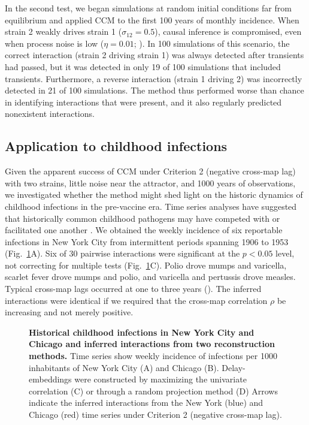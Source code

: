 \documentclass[10pt,letterpaper]{article}
\begin{document}
In the second test, we began simulations at random initial conditions far from equilibrium and applied CCM to the first 100 years of monthly incidence.
When strain 2 weakly drives strain 1 ($\sigma_{12}=0.5$), causal inference is compromised, even when process noise is low ($\eta=0.01$; ).
In 100 simulations of this scenario, the correct interaction (strain 2 driving strain 1) was always detected after transients had passed, but it was detected in only 19 of 100 simulations that included transients.
Furthermore, a reverse interaction (strain 1 driving 2) was incorrectly detected in 21 of 100 simulations.
The method thus performed worse than chance in identifying interactions that were present, and it also regularly predicted nonexistent interactions.

\subsection*{Application to childhood infections}

Given the apparent success of CCM under Criterion 2 (negative cross-map lag) with two strains, little noise near the attractor, and 1000 years of observations, we investigated whether the method might shed light on the historic dynamics of childhood infections in the pre-vaccine era.
Time series analyses have suggested that historically common childhood pathogens may have competed with or facilitated one another \cite{Mina2015, Rohani2003}.
We obtained the weekly incidence of six reportable infections in New York City from intermittent periods spanning 1906 to 1953 \cite{vanPanhuis2013} (Fig.~\ref{fig:historical_data_tmp}A).
Six of 30 pairwise interactions were significant at the $p<0.05$ level, not correcting for multiple tests (Fig.~\ref{fig:historical_data_tmp}C).
Polio drove mumps and varicella, scarlet fever drove mumps and polio, and varicella and pertussis drove measles. 
Typical cross-map lags occurred at one to three years ().
The inferred interactions were identical if we required that the cross-map correlation $\rho$ be increasing and not merely positive.

\begin{figure}
    \caption{\textbf{Historical childhood infections in New York City and Chicago and inferred interactions from two reconstruction methods.} Time series show weekly incidence of infections per 1000 inhabitants of New York City (A) and Chicago (B). Delay-embeddings were constructed by maximizing the univariate correlation (C) or through a random projection method (D) Arrows indicate the inferred interactions from the New York (blue) and Chicago (red) time series under Criterion 2 (negative cross-map lag).\label{fig:historical_data_tmp}} 
\end{figure}
\end{document}

